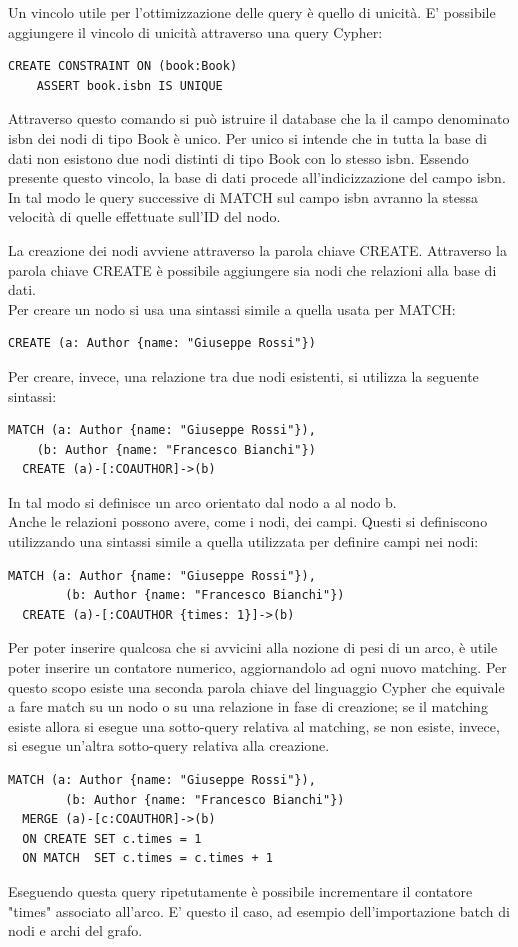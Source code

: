 \documentclass[a4paper,12pt]{article}
\begin{document}
Un vincolo utile per l'ottimizzazione delle query è quello di unicità. E' possibile aggiungere il vincolo di unicità attraverso una query Cypher:
\begin{lstlisting}[keepspaces=true]
  CREATE CONSTRAINT ON (book:Book)
    ASSERT book.isbn IS UNIQUE
\end{lstlisting}
Attraverso questo comando si può istruire il database che la il campo denominato isbn dei nodi di tipo Book è unico. Per unico si intende che in tutta la base di dati non esistono due nodi distinti di tipo Book con lo stesso isbn. Essendo presente questo vincolo, la base di dati procede all'indicizzazione del campo isbn. In tal modo le query successive di MATCH sul campo isbn avranno la stessa velocità di quelle effettuate sull'ID del nodo.
\par
La creazione dei nodi avviene attraverso la parola chiave CREATE. Attraverso la parola chiave CREATE è possibile aggiungere sia nodi che relazioni alla base di dati. \\
Per creare un nodo si usa una sintassi simile a quella usata per MATCH:
\begin{lstlisting}[keepspaces=true]
  CREATE (a: Author {name: "Giuseppe Rossi"})
\end{lstlisting}
Per creare, invece, una relazione tra due nodi esistenti, si utilizza la seguente sintassi:
\begin{lstlisting}[keepspaces=true]
  MATCH (a: Author {name: "Giuseppe Rossi"}),
    (b: Author {name: "Francesco Bianchi"})
  CREATE (a)-[:COAUTHOR]->(b)
\end{lstlisting}
In tal modo si definisce un arco orientato dal nodo a al nodo b. \\
Anche le relazioni possono avere, come i nodi, dei campi. Questi si definiscono utilizzando una sintassi simile a quella utilizzata per definire campi nei nodi:
\begin{lstlisting}[keepspaces=true]
  MATCH (a: Author {name: "Giuseppe Rossi"}),
        (b: Author {name: "Francesco Bianchi"})
  CREATE (a)-[:COAUTHOR {times: 1}]->(b)
\end{lstlisting}
Per poter inserire qualcosa che si avvicini alla nozione di pesi di un arco, è utile poter inserire un contatore numerico, aggiornandolo ad ogni nuovo matching.
Per questo scopo esiste una seconda parola chiave del linguaggio Cypher che equivale a fare match su un nodo o su una relazione in fase di creazione; se il matching esiste allora si esegue una sotto-query relativa al matching, se non esiste, invece, si esegue un'altra sotto-query relativa alla creazione.
\begin{lstlisting}[keepspaces=true]
  MATCH (a: Author {name: "Giuseppe Rossi"}),
        (b: Author {name: "Francesco Bianchi"})
  MERGE (a)-[c:COAUTHOR]->(b)
  ON CREATE SET c.times = 1
  ON MATCH  SET c.times = c.times + 1
\end{lstlisting}
Eseguendo questa query ripetutamente è possibile incrementare il contatore "times" associato all'arco. E' questo il caso, ad esempio dell'importazione batch di nodi e archi del grafo. \\
\end{document}
